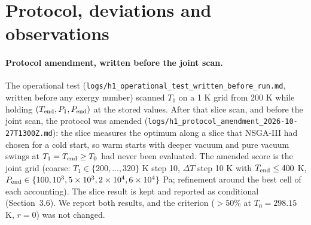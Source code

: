 \documentclass[10pt]{article}
\begin{document}
\section{Protocol, deviations and observations}\label{sec:dev}
\paragraph{Protocol amendment, written before the joint scan.} The operational test (\texttt{logs/h1\_operational\_test\_written\_before\_run.md}, written before any exergy number) scanned $T_1$ on a 1 K grid from 200 K while holding $(T_{\rm end},P_1,P_{\rm end})$ at the stored values. After that slice scan, and before the joint scan, the protocol was amended (\texttt{logs/h1\_protocol\_amendment\_2026-10-27T1300Z.md}): the slice measures the optimum along a slice that NSGA-III had chosen for a cold start, so warm starts with deeper vacuum and pure vacuum swings at $T_1=T_{\rm end}\ge T_0$ had never been evaluated.
The amended score is the joint grid (coarse: $T_1\in\{200,\ldots,320\}$ K step 10, $\Delta T$ step 10 K with $T_{\rm end}\le400$ K, $P_{\rm end}\in\{100,10^3,5\times10^3,2\times10^4,6\times10^4\}$ Pa; refinement around the best cell of each accounting). The slice result is kept and reported as conditional (Section~3.6). We report both results, and the criterion ($>50\%$ at $T_0=298.15$ K, $r=0$) was not changed.
\end{document}
